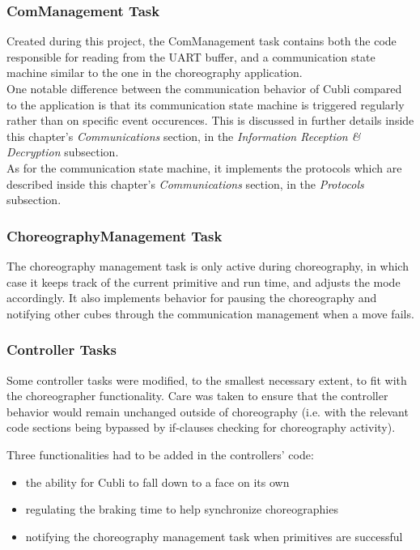 \subsubsection{ComManagement Task}

Created during this project, the ComManagement task contains both the code responsible for reading from the UART buffer, and a communication state machine similar to the one in the choreography application.\\

One notable difference between the communication behavior of Cubli compared to the application is that its communication state machine is triggered regularly rather than on specific event occurences. This is discussed in further details inside this chapter's \textit{Communications} section, in the \textit{Information Reception \& Decryption} subsection.\\ 

As for the communication state machine, it implements the protocols which are described inside this chapter's \textit{Communications} section, in the \textit{Protocols} subsection. 

\subsubsection{ChoreographyManagement Task}

The choreography management task is only active during choreography, in which case it keeps track of the current primitive and run time, and adjusts the mode accordingly. It also implements behavior for pausing the choreography and notifying other cubes through the communication management when a move fails.



\subsubsection{Controller Tasks}

Some controller tasks were modified, to the smallest necessary extent, to fit with the choreographer functionality. Care was taken to ensure that the controller behavior would remain unchanged outside of choreography (i.e. with the relevant code sections being bypassed by if-clauses checking for choreography activity).

Three functionalities had to be added in the controllers' code:
\begin{itemize}
\item the ability for Cubli to fall down to a face on its own
\item regulating the braking time to help synchronize choreographies
\item notifying the choreography management task when primitives are successful
\end{itemize}

